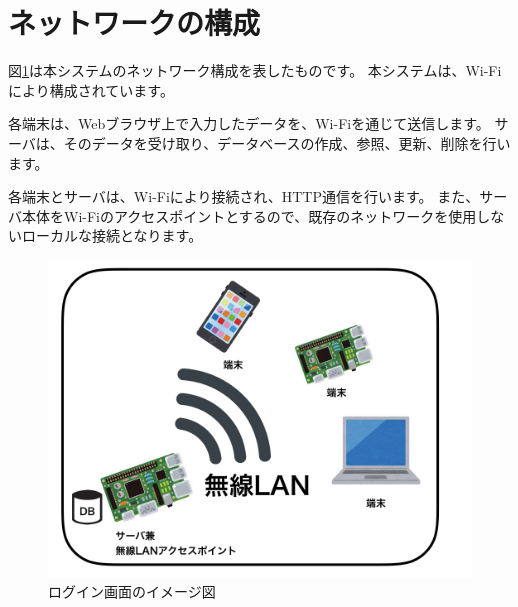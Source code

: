 \section{ネットワークの構成}
図\ref{fig:wifi}は本システムのネットワーク構成を表したものです。
本システムは、Wi-Fiにより構成されています。

各端末は、Webブラウザ上で入力したデータを、Wi-Fiを通じて送信します。
サーバは、そのデータを受け取り、データベースの作成、参照、更新、削除を行います。

各端末とサーバは、Wi-Fiにより接続され、HTTP通信を行います。
また、サーバ本体をWi-Fiのアクセスポイントとするので、既存のネットワークを使用しないローカルな接続となります。

\begin{figure}[htbp]
  \begin{center}
    \includegraphics[width=1\linewidth,clip]{./img/wifi.jpeg}
    \caption{ログイン画面のイメージ図}\label{fig:wifi}
  \end{center}
\end{figure}
